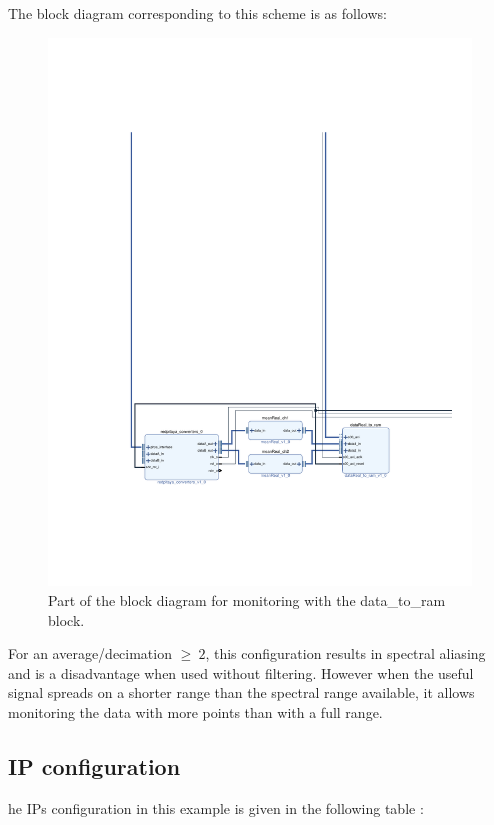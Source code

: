 \documentclass[12pt,oneside]{article}
\begin{document}
The block diagram corresponding to this scheme is as follows:

\begin{figure}[h!tb]
	\begin{center}
		\includegraphics[width=15cm,trim={4cm 5cm 4cm 18cm}, clip]{design/data2ramMoy.pdf}
		\caption{Part of the block diagram for monitoring with the data\_to\_ram block.}
		\label{fig:data2ram}
	\end{center}
\end{figure}

For an average/decimation $\geq ~2$, this configuration results in spectral aliasing and is a disadvantage when used without filtering. However when the useful signal spreads on a shorter range than the spectral range available, it allows monitoring the data with more points than with a full range. 

\vspace{0.0cm}
\subsection{IP configuration}
he IPs configuration in this example is given in the following table :
\end{document}
